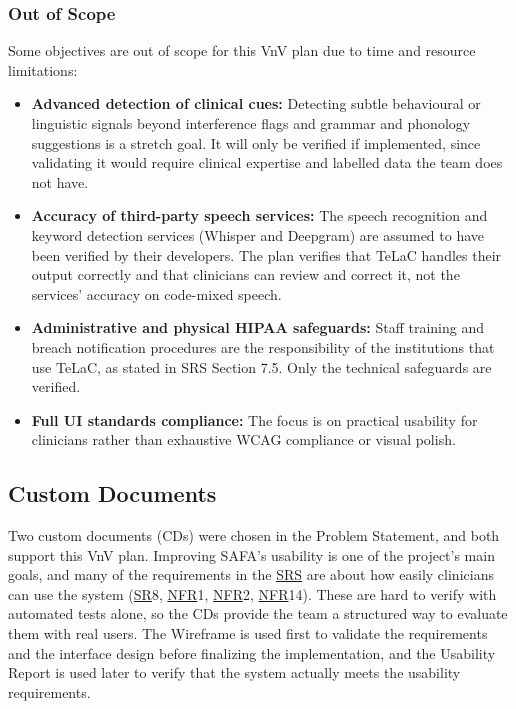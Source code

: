 \documentclass[12pt, titlepage]{article}
\newcommand{\SRSLink}{\href{https://github.com/Nour-Fawaz/MacaBoca/blob/main/pdfs/SRS/SRS.pdf}{SRS}}
\newcommand{\srsnfr}[1]{\href{https://github.com/Nour-Fawaz/MacaBoca/blob/main/pdfs/SRS/SRS.pdf}{NFR}}
\newcommand{\srssr}[1]{\href{https://github.com/Nour-Fawaz/MacaBoca/blob/main/pdfs/SRS/SRS.pdf}{SR}}
\renewcommand{\_}{\oldunderscore\allowbreak}
\begin{document}
\subsubsection{Out of Scope}
Some objectives are out of scope for this VnV plan due to time and resource limitations:
\begin{itemize}
  \item \textbf{Advanced detection of clinical cues:} Detecting subtle behavioural or linguistic signals beyond interference flags and grammar and phonology suggestions is a stretch goal. It will only be verified if implemented, since validating it would require clinical expertise and labelled data the team does not have.
  \item \textbf{Accuracy of third-party speech services:} The speech recognition and keyword detection services (Whisper and Deepgram) are assumed to have been verified by their developers. The plan verifies that TeLaC handles their output correctly and that clinicians can review and correct it, not the services' accuracy on code-mixed speech.
  \item \textbf{Administrative and physical HIPAA safeguards:} Staff training and breach notification procedures are the responsibility of the institutions that use TeLaC, as stated in SRS Section 7.5. Only the technical safeguards are verified.
  \item \textbf{Full UI standards compliance:} The focus is on practical usability for clinicians rather than exhaustive WCAG compliance or visual polish.
\end{itemize}

\subsection{Custom Documents} \label{sec:CustomDocs}

Two custom documents (CDs) were chosen in the Problem Statement, and both support this VnV plan.
Improving SAFA's usability is one of the project's main goals, and many of the requirements in the \SRSLink{} are about how easily clinicians can use the system (\srssr*{8}, \srsnfr*{1}, \srsnfr*{2}, \srsnfr*{14}).
These are hard to verify with automated tests alone, so the CDs provide the team a structured way to evaluate them with real users.
The Wireframe is used first to validate the requirements and the interface design before finalizing the implementation, and the Usability Report is used later to verify that the system actually meets the usability requirements.
\end{document}
